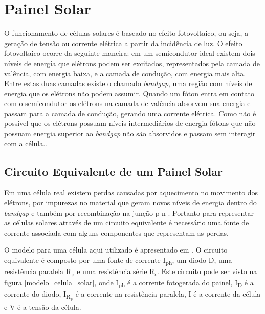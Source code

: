 \chapter{Painel Solar} \label{secao:painel solar}

O funcionamento de células solares é baseado no efeito fotovoltaico, ou seja, a geração de tensão ou corrente elétrica a partir da incidência de luz. O efeito fotovoltaico ocorre da seguinte maneira: em um semicondutor ideal existem dois níveis de energia que elétrons podem ser excitados, representados pela camada de valência, com energia baixa, e a camada de condução, com energia mais alta. Entre estas duas camadas existe o chamado \textit{bandgap}, uma região com níveis de energia que os elétrons não podem assumir. Quando um fóton entra em contato com o semicondutor os elétrons na camada de valência absorvem sua energia e passam para a camada de condução, gerando uma corrente elétrica. Como não é possível que os elétrons possuam níveis intermediários de energia fótons que não possuam energia superior ao \textit{bandgap} não são absorvidos e passam sem interagir com a célula.\cite{jager2014}.

\section{Circuito Equivalente de um Painel Solar}

Em uma célula real existem perdas causadas por aquecimento no movimento dos elétrons, por impurezas no material que geram novos níveis de energia dentro do \textit{bandgap} e também por recombinação na junção p-n \cite{blakers2013}. Portanto para representar as células solares através de um circuito equivalente é necessário uma fonte de corrente associada com alguns componentes que representam as perdas.

O modelo para uma célula aqui utilizado é apresentado em \cite{erdem2013}. O circuito equivalente é composto por uma fonte de corrente I\textsubscript{ph}, um diodo D, uma resistência paralela R\textsubscript{p} e uma resistência série R\textsubscript{s}. Este circuito pode ser visto na figura \ref{modelo_celula_solar}, onde I\textsubscript{ph} é a corrente fotogerada do painel, I\textsubscript{D} é a corrente do diodo, I\textsubscript{R\textsubscript{p}} é a corrente na resistência paralela, I é a corrente da célula e V é a tensão da célula.


